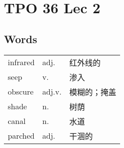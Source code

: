 \section{TPO 36 Lec 2}

\subsection{Words}

\begin{tabular}{lll}
    infrared & adj.   & 红外线的   \\
    seep     & v.     & 渗入     \\
    obscure  & adj.v. & 模糊的；掩盖 \\
    shade    & n.     & 树荫     \\
    canal    & n.     & 水道     \\
    parched  & adj.   & 干涸的    \\
\end{tabular}

